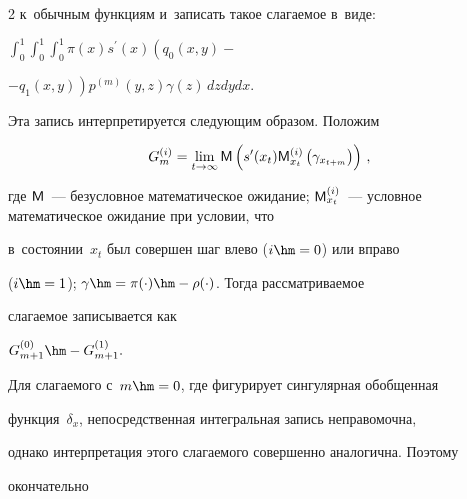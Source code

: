 \begin{multicols}{2}
к~обычным функциям и~записать такое слагаемое в~виде:




$\int\nolimits_0^1\!


\int\nolimits_0^1\!


 \int\nolimits_0^1


  \pi(x)s^\prime(x) 


\left( q_0(x,y)-\right.$\linebreak %




$\left.-q_1(x,y)\right) p^{(m)} (y,z) \gamma(z)\,dzdydx$.




  


  Эта запись интерпретируется следующим образом. Положим


  \begin{equation}


  G_m^{(i)} =\lim\limits_{t\to \infty} {\sf M}\left(  s^\prime(x_t) {\sf 


M}_{x_t}^{(i)}\left( \gamma_{x_{t+m}}\right)\right)\,,


  \label{e10-kr}


  \end{equation}


где ${\sf M}$~--- безусловное математическое ожидание; ${\sf 


M}_{x_t}^{(i)}$~--- условное математическое ожидание при условии, что 


в~состоянии~$x_t$ был совершен шаг влево ($i\hm=0$) или вправо 


($i\hm=1$); $\gamma\hm= \pi(\cdot)\hm- \rho(\cdot)$. Тогда рас\-смат\-ри\-ва\-емое 


слагаемое записывается как


$G_{m+1}^{(0)} \hm-G^{(1)}_{m+1}.$


  


  Для слагаемого с~$m\hm=0$, где фигурирует сингулярная обобщенная 


функция~$\delta_x$, непосредственная интегральная запись неправомочна, 


однако интерпретация этого слагаемого совершенно аналогична. Поэтому 


окончательно


  \begin{equation*}



\end{equation*}
\end{multicols}
